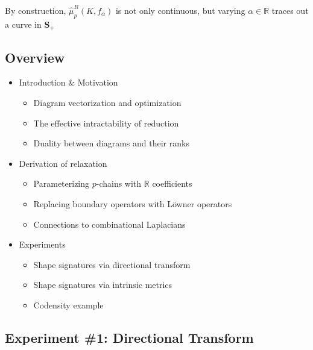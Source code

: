 \documentclass[
  letterpaper,
  DIV=11,
  numbers=noendperiod,
  oneside]{scrartcl}
\providecommand{\tightlist}{%
  \setlength{\itemsep}{0pt}\setlength{\parskip}{0pt}}\usepackage{longtable,booktabs,array}
\begin{document}
By construction, \(\hat{\mu}_p^R(K, f_\alpha)\) is not only continuous,
but varying \(\alpha \in \mathbb{R}\) traces out a curve in
\(\mathbf{S}_+\)

\hypertarget{overview-1}{%
\subsection{Overview}\label{overview-1}}

\begin{itemize}
\tightlist
\item
  Introduction \& Motivation

  \begin{itemize}
  \tightlist
  \item
    Diagram vectorization and optimization
  \item
    The effective intractability of reduction
  \item
    Duality between diagrams and their ranks
  \end{itemize}
\end{itemize}

\begin{itemize}
\tightlist
\item
  Derivation of relaxation

  \begin{itemize}
  \tightlist
  \item
    Parameterizing \(p\)-chains with \(\mathbb{R}\) coefficients
  \item
    Replacing boundary operators with Löwner operators
  \item
    Connections to combinational Laplacians
  \end{itemize}
\end{itemize}

\begin{itemize}
\tightlist
\item
  Experiments

  \begin{itemize}
  \tightlist
  \item
    Shape signatures via directional transform
  \item
    Shape signatures via intrinsic metrics\\
  \item
    Codensity example
  \end{itemize}
\end{itemize}

\hypertarget{experiment-1-directional-transform}{%
\subsection{Experiment \#1: Directional
Transform}\label{experiment-1-directional-transform}}
\end{document}
